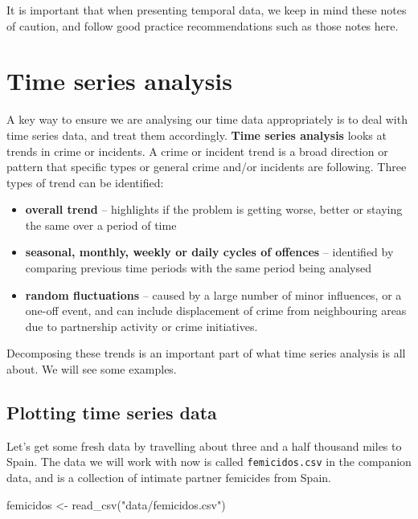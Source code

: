 \documentclass[
  krantz2]{krantz}
\makeatletter
\newenvironment{Shaded}{\begin{snugshade}}{\end{snugshade}}
\newcommand{\FunctionTok}[1]{\textcolor[rgb]{0,0,0}{#1}}
\newcommand{\NormalTok}[1]{#1}
\newcommand{\OtherTok}[1]{\textcolor[rgb]{0.37,0.37,0.37}{#1}}
\newcommand{\StringTok}[1]{\textcolor[rgb]{0.5,0.5,0.5}{#1}}
\providecommand{\tightlist}{%
  \setlength{\itemsep}{0pt}\setlength{\parskip}{0pt}}
\newenvironment{kframe}{%
\medskip{}
\setlength{\fboxsep}{.8em}
 \def\at@end@of@kframe{}%
 \ifinner\ifhmode%
  \def\at@end@of@kframe{\end{minipage}}%
  \begin{minipage}{\columnwidth}%
 \fi\fi%
 \def\FrameCommand##1{\hskip\@totalleftmargin \hskip-\fboxsep
 \colorbox{shadecolor}{##1}\hskip-\fboxsep
     \hskip-\linewidth \hskip-\@totalleftmargin \hskip\columnwidth}%
 \MakeFramed {\advance\hsize-\width
   \@totalleftmargin\z@ \linewidth\hsize
   \@setminipage}}%
 {\par\unskip\endMakeFramed%
 \at@end@of@kframe}
\renewenvironment{Shaded}{\begin{kframe}}{\end{kframe}}
\makeatother
\begin{document}
It is important that when presenting temporal data, we keep in mind these notes of caution, and follow good practice recommendations such as those notes here.

\hypertarget{time-series-analysis}{%
\section{Time series analysis}\label{time-series-analysis}}

A key way to ensure we are analysing our time data appropriately is to deal with time series data, and treat them accordingly. \textbf{Time series analysis} looks at trends in crime or incidents. A crime or incident trend is a broad direction or pattern that specific types or general crime and/or incidents are following. Three types of trend can be identified:

\begin{itemize}
\tightlist
\item
  \textbf{overall trend} -- highlights if the problem is getting worse, better or staying the same over a period of time
\item
  \textbf{seasonal, monthly, weekly or daily cycles of offences} -- identified by comparing previous time periods with the same period being analysed
\item
  \textbf{random fluctuations} -- caused by a large number of minor influences, or a one-off event, and can include displacement of crime from neighbouring areas due to partnership activity or crime initiatives.
\end{itemize}

Decomposing these trends is an important part of what time series analysis is all about. We will see some examples.

\hypertarget{plotting-time-series-data}{%
\subsection{Plotting time series data}\label{plotting-time-series-data}}

Let's get some fresh data by travelling about three and a half thousand miles to Spain. The data we will work with now is called \texttt{femicidos.csv} in the companion data, and is a collection of intimate partner femicides from Spain.

\begin{Shaded}
\begin{Highlighting}[]
\NormalTok{femicidos }\OtherTok{\textless{}{-}} \FunctionTok{read\_csv}\NormalTok{(}\StringTok{"data/femicidos.csv"}\NormalTok{)}
\end{Highlighting}
\end{Shaded}
\end{document}
